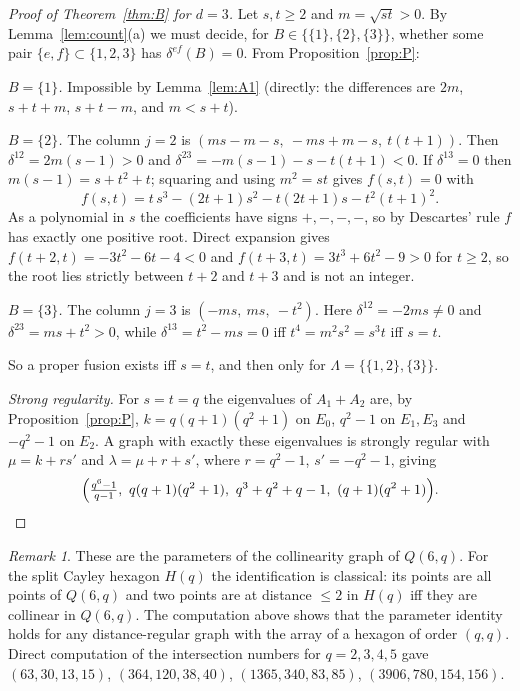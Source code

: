 \documentclass[11pt]{article}
\theoremstyle{remark}
\newtheorem{remark}[theorem]{Remark}
\begin{document}
\begin{proof}[Proof of Theorem~\ref{thm:B} for $d=3$]
Let $s,t\ge2$ and $m=\sqrt{st}>0$. By Lemma~\ref{lem:count}(a) we must decide, for $B\in\{\{1\},\{2\},\{3\}\}$, whether some pair $\{e,f\}\subset\{1,2,3\}$ has $\delta^{ef}(B)=0$. From Proposition~\ref{prop:P}:

\smallskip\noindent\emph{$B=\{1\}$.} Impossible by Lemma~\ref{lem:A1} (directly: the differences are $2m$, $s+t+m$, $s+t-m$, and $m<s+t$).

\smallskip\noindent\emph{$B=\{2\}$.} The column $j=2$ is $(ms-m-s,\ -ms+m-s,\ t(t+1))$. Then $\delta^{12}=2m(s-1)>0$ and $\delta^{23}=-m(s-1)-s-t(t+1)<0$. If $\delta^{13}=0$ then $m(s-1)=s+t^2+t$; squaring and using $m^2=st$ gives $f(s,t)=0$ with
\[
f(s,t)=t\,s^3-(2t+1)s^2-t(2t+1)s-t^2(t+1)^2 .
\]
As a polynomial in $s$ the coefficients have signs $+,-,-,-$, so by Descartes' rule $f$ has exactly one positive root. Direct expansion gives $f(t+2,t)=-3t^2-6t-4<0$ and $f(t+3,t)=3t^3+6t^2-9>0$ for $t\ge2$, so the root lies strictly between $t+2$ and $t+3$ and is not an integer.

\smallskip\noindent\emph{$B=\{3\}$.} The column $j=3$ is $(-ms,\ ms,\ -t^2)$. Here $\delta^{12}=-2ms\ne0$ and $\delta^{23}=ms+t^2>0$, while $\delta^{13}=t^2-ms=0$ iff $t^4=m^2s^2=s^3t$ iff $s=t$.

So a proper fusion exists iff $s=t$, and then only for $\Lambda=\{\{1,2\},\{3\}\}$.

\smallskip\noindent\emph{Strong regularity.} For $s=t=q$ the eigenvalues of $A_1+A_2$ are, by Proposition~\ref{prop:P}, $k=q(q+1)(q^2+1)$ on $E_0$, $q^2-1$ on $E_1,E_3$ and $-q^2-1$ on $E_2$. A graph with exactly these eigenvalues is strongly regular with $\mu=k+rs'$ and $\lambda=\mu+r+s'$, where $r=q^2-1$, $s'=-q^2-1$, giving
\[
\Bigl(\tfrac{q^6-1}{q-1},\ q(q+1)(q^2+1),\ q^3+q^2+q-1,\ (q+1)(q^2+1)\Bigr).
\]
\end{proof}

\begin{remark}\label{rem:hex}
These are the parameters of the collinearity graph of $Q(6,q)$. For the split Cayley hexagon $H(q)$ the identification is classical: its points are all points of $Q(6,q)$ and two points are at distance $\le2$ in $H(q)$ iff they are collinear in $Q(6,q)$. The computation above shows that the parameter identity holds for any distance-regular graph with the array of a hexagon of order $(q,q)$. Direct computation of the intersection numbers for $q=2,3,4,5$ gave $(63,30,13,15)$, $(364,120,38,40)$, $(1365,340,83,85)$, $(3906,780,154,156)$.
\end{remark}
\end{document}
